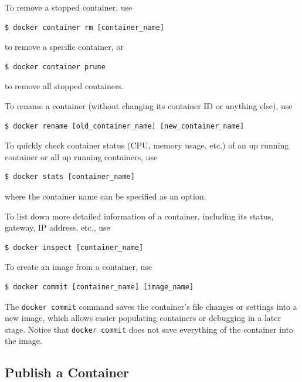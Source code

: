 To remove a stopped container, use
\begin{lstlisting}
$ docker container rm [container_name]
\end{lstlisting}
to remove a specific container, or
\begin{lstlisting}
$ docker container prune
\end{lstlisting}
to remove all stopped containers.

To rename a container (without changing its container ID or anything else), use
\begin{lstlisting}
$ docker rename [old_container_name] [new_container_name]
\end{lstlisting}

To quickly check container status (CPU, memory usage, etc.) of an up running container or all up running containers, use
\begin{lstlisting}
$ docker stats [container_name]
\end{lstlisting}
where the container name can be specified as an option.

To list down more detailed information of a container, including its status, gateway, IP address, etc., use
\begin{lstlisting}
$ docker inspect [container_name]
\end{lstlisting}

To create an image from a container, use
\begin{lstlisting}
$ docker commit [container_name] [image_name]
\end{lstlisting}
The \verb|docker commit| command saves the container's file changes or settings into a new image, which allows easier populating containers or debugging in a later stage. Notice that \verb|docker commit| does not save everything of the container into the image.

\subsection{Publish a Container}

